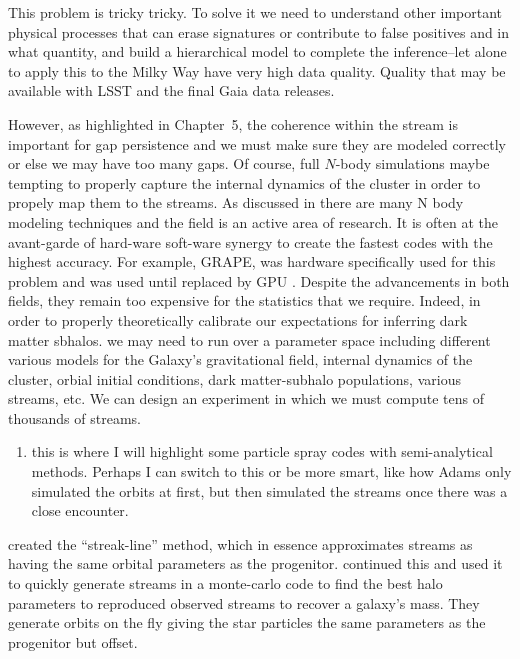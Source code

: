         This problem is tricky tricky. To solve it we need to understand other important physical processes that can erase signatures or contribute to false positives and in what quantity, and build a hierarchical model to complete the inference--let alone to apply this to the Milky Way have very high data quality. Quality that may be available with LSST and the final Gaia data releases.

        However, as highlighted in Chapter~5, the coherence within the stream is important for gap persistence and we must make sure they are modeled correctly or else we may have too many gaps. Of course, full $N$-body simulations maybe tempting to properly capture the internal dynamics of the cluster in order to propely map them to the streams. As discussed in \citet{2018ComAC...5....2V,2023LRCA....9....3S} there are many N body modeling techniques and the field is an active area of research. It is often at the avant-garde of hard-ware soft-ware synergy to create the fastest codes with the highest accuracy. For example, GRAPE, was hardware specifically used for this problem and was used until replaced by GPU \citep{2012MNRAS.424..545N,2015MNRAS.450.4070W}. Despite the advancements in both fields, they remain too expensive for the statistics that we require. Indeed, in order to properly theoretically calibrate our expectations for inferring dark matter sbhalos. we may need to run over a parameter space including different various models for the Galaxy's gravitational field, internal dynamics of the cluster, orbial initial conditions, dark matter-subhalo populations, various streams, etc. We can design an experiment in which we must compute tens of thousands of streams. 


        \begin{enumerate}
            \item this is where I will highlight some particle spray codes with semi-analytical methods. Perhaps I can switch to this or be more smart, like how Adams only simulated the orbits at first, but then simulated the streams once there was a close encounter. 
        \end{enumerate}


        \citet{2012MNRAS.420.2700K} created the ``streak-line'' method, which in essence approximates streams as having the same orbital parameters as the progenitor. \citet{2014ApJ...795...94B} continued this and used it to quickly generate streams in a monte-carlo code to find the best halo parameters to reproduced observed streams to recover a galaxy's mass. They generate orbits on the fly giving the star particles the same parameters as the progenitor but offset. 

